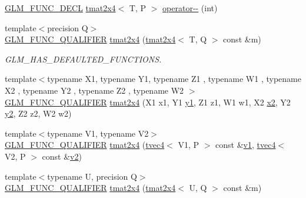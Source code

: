 \begin{DoxyCompactItemize}
\item 
\mbox{\hyperlink{setup_8hpp_ab2d052de21a70539923e9bcbf6e83a51}{G\+L\+M\+\_\+\+F\+U\+N\+C\+\_\+\+D\+E\+CL}} \mbox{\hyperlink{structglm_1_1tmat2x4}{tmat2x4}}$<$ T, P $>$ \mbox{\hyperlink{structglm_1_1tmat2x4_ac1f8d36996a11d5fcf0d1ff29b254ba6}{operator-\/-\/}} (int)
\item 
{\footnotesize template$<$precision Q$>$ }\\\mbox{\hyperlink{setup_8hpp_a33fdea6f91c5f834105f7415e2a64407}{G\+L\+M\+\_\+\+F\+U\+N\+C\+\_\+\+Q\+U\+A\+L\+I\+F\+I\+ER}} \mbox{\hyperlink{structglm_1_1tmat2x4_a8f8c262382e497559d75eed475deaa49}{tmat2x4}} (\mbox{\hyperlink{structglm_1_1tmat2x4}{tmat2x4}}$<$ T, Q $>$ const \&m)
\begin{DoxyCompactList}\small\item\em G\+L\+M\+\_\+\+H\+A\+S\+\_\+\+D\+E\+F\+A\+U\+L\+T\+E\+D\+\_\+\+F\+U\+N\+C\+T\+I\+O\+NS. \end{DoxyCompactList}\item 
{\footnotesize template$<$typename X1, typename Y1, typename Z1 , typename W1 , typename X2 , typename Y2 , typename Z2 , typename W2 $>$ }\\\mbox{\hyperlink{setup_8hpp_a33fdea6f91c5f834105f7415e2a64407}{G\+L\+M\+\_\+\+F\+U\+N\+C\+\_\+\+Q\+U\+A\+L\+I\+F\+I\+ER}} \mbox{\hyperlink{structglm_1_1tmat2x4_a8999dd2b5dc9b8af638c4e80ceebbf9b}{tmat2x4}} (X1 x1, Y1 \mbox{\hyperlink{glad_8h_a48340161068d267815ac3131e9d03def}{y1}}, Z1 z1, W1 w1, X2 \mbox{\hyperlink{glad_8h_ad2cea6eadb01f017f0d57e7edf0ce988}{x2}}, Y2 \mbox{\hyperlink{glad_8h_af7158b5d27f7a6aa4ab9973fcc3a5c20}{y2}}, Z2 z2, W2 w2)
\item 
{\footnotesize template$<$typename V1, typename V2$>$ }\\\mbox{\hyperlink{setup_8hpp_a33fdea6f91c5f834105f7415e2a64407}{G\+L\+M\+\_\+\+F\+U\+N\+C\+\_\+\+Q\+U\+A\+L\+I\+F\+I\+ER}} \mbox{\hyperlink{structglm_1_1tmat2x4_ac88d0804ec99669ad212426a520a6fee}{tmat2x4}} (\mbox{\hyperlink{structglm_1_1tvec4}{tvec4}}$<$ V1, P $>$ const \&\mbox{\hyperlink{glad_8h_a0779c3b73f9aa3a0ac5b0139b5d291d9}{v1}}, \mbox{\hyperlink{structglm_1_1tvec4}{tvec4}}$<$ V2, P $>$ const \&\mbox{\hyperlink{glad_8h_a9a09a1837922b2b806f4589096a52049}{v2}})
\item 
{\footnotesize template$<$typename U, precision Q$>$ }\\\mbox{\hyperlink{setup_8hpp_a33fdea6f91c5f834105f7415e2a64407}{G\+L\+M\+\_\+\+F\+U\+N\+C\+\_\+\+Q\+U\+A\+L\+I\+F\+I\+ER}} \mbox{\hyperlink{structglm_1_1tmat2x4_af1c270415a38eaf9a9d62ebf1e5b5ce4}{tmat2x4}} (\mbox{\hyperlink{structglm_1_1tmat2x4}{tmat2x4}}$<$ U, Q $>$ const \&m)

\end{DoxyCompactItemize}
